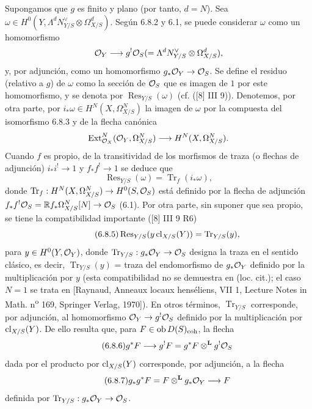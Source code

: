 Supongamos que $g$ es finito y plano (por tanto, $d=N$). Sea $\omega\in H^0(Y,\Lambda^d N_{Y/S}^{\vee}\otimes\Omega^d_{X/S})$. Según 6.8.2 y 6.1, se puede considerar $\omega$ como un homomorfismo
\[
\mathcal{O}_Y\longrightarrow g^!\mathcal{O}_S(=\Lambda^d N_{Y/S}^{\vee}\otimes\Omega^d_{X/S}),
\]
y, por adjunción, como un homomorfismo $g_*\mathcal{O}_Y\to\mathcal{O}_S$. Se define el residuo (relativo a $g$) de $\omega$ como la sección de $\mathcal{O}_S$ que es imagen de $1$ por este homomorfismo, y se denota por $\operatorname{Res}_{Y/S}(\omega)$ (cf. ([8] III 9)). Denotemos, por otra parte, por $i_*\omega\in H^N(X,\Omega^N_{X/S})$ la imagen de $\omega$ por la compuesta del isomorfismo 6.8.3 y de la flecha canónica
\[
\operatorname{Ext}^N_{\mathcal{O}_X}(\mathcal{O}_Y,\Omega^N_{X/S})\longrightarrow H^N(X,\Omega^N_{X/S}).
\]
Cuando $f$ es propio, de la transitividad de los morfismos de traza (o flechas de adjunción) $i_*i^!\to 1$ y $f_*f^!\to 1$ se deduce que
\begin{equation}
\tag{6.8.4}
\operatorname{Res}_{Y/S}(\omega)=\operatorname{Tr}_f(i_*\omega),
\end{equation}
donde $\operatorname{Tr}_f:H^N(X,\Omega^N_{X/S})\to H^0(S,\mathcal{O}_S)$ está definido por la flecha de adjunción $f_*f^!\mathcal{O}_S=\mathbb{R} f_*\Omega^N_{X/S}[N]\to\mathcal{O}_S$ (6.1). Por otra parte, sin suponer que sea propio, se tiene la compatibilidad importante ([8] III 9 R6)
\begin{equation}
\tag{6.8.5}
\operatorname{Res}_{Y/S}(y\operatorname{cl}_{X/S}(Y))=\operatorname{Tr}_{Y/S}(y),
\end{equation}
para $y\in H^0(Y,\mathcal{O}_Y)$, donde $\operatorname{Tr}_{Y/S}:g_*\mathcal{O}_Y\to\mathcal{O}_S$ designa la traza en el sentido clásico, es decir, $\operatorname{Tr}_{Y/S}(y)$ = traza del endomorfismo de $g_*\mathcal{O}_Y$ definido por la multiplicación por $y$ (esta compatibilidad no se demuestra en (loc. cit.); el caso $N=1$ se trata en [Raynaud, Anneaux locaux henséliens, VII 1, Lecture Notes in Math. n\textsuperscript{o} 169, Springer Verlag, 1970]). En otros términos, $\operatorname{Tr}_{Y/S}$ corresponde, por adjunción, al homomorfismo $\mathcal{O}_Y\to g^!\mathcal{O}_S$ definido por la multiplicación por $\operatorname{cl}_{X/S}(Y)$. De ello resulta que, para $F\in\operatorname{ob} D(S)_{\mathrm{coh}}$, la flecha
\begin{equation}
\tag{6.8.6}
g^*F\longrightarrow g^!F=g^*F\otimes^{\mathbf L}g^!\mathcal{O}_S
\end{equation}
dada por el producto por $\operatorname{cl}_{X/S}(Y)$ corresponde, por adjunción, a la flecha
\begin{equation}
\tag{6.8.7}
g_*g^*F=F\otimes^{\mathbf L}g_*\mathcal{O}_Y\longrightarrow F
\end{equation}
definida por $\operatorname{Tr}_{Y/S}:g_*\mathcal{O}_Y\to\mathcal{O}_S$.

